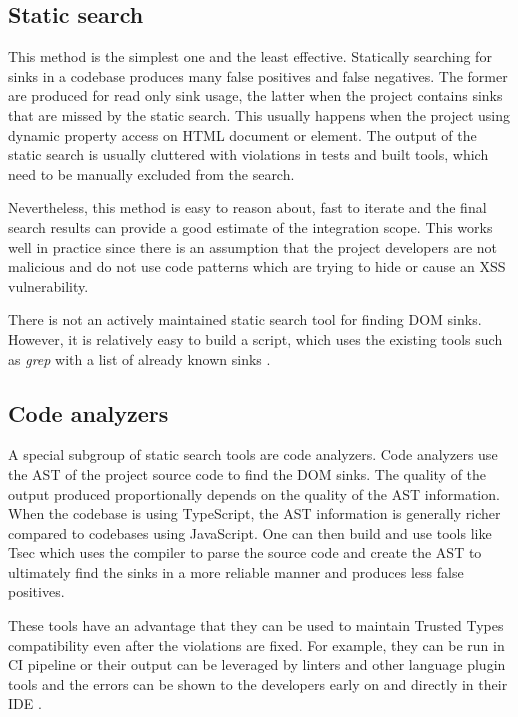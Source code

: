 \subsection{Static search}

This method is the simplest one and the least effective. Statically searching for sinks in a
codebase produces many false positives and false negatives. The former are produced for read only
sink usage, the latter when the project contains sinks that are missed by the static search. This
usually happens when the project using dynamic property access on HTML document or element. The
output of the static search is usually cluttered with violations in tests and built tools, which
need to be manually excluded from the search.

Nevertheless, this method is easy to reason about, fast to iterate and the final search results can
provide a good estimate of the integration scope. This works well in practice since there is an
assumption that the project developers are not malicious and do not use code patterns which are
trying to hide or cause an XSS vulnerability.

There is not an actively maintained static search tool for finding DOM sinks. However, it is
relatively easy to build a script, which uses the existing tools such as \emph{grep} with a list
of already known sinks \cite{xss_sink_finder}.

\subsection{Code analyzers}

A special subgroup of static search tools are code analyzers. Code analyzers use the AST of the
project source code to find the DOM sinks. The quality of the output produced proportionally depends
on the quality of the AST information. When the codebase is using TypeScript, the AST information is
generally richer compared to codebases using JavaScript. One can then build and use tools like Tsec
\cite{tsec_github} which uses the compiler to parse the source code and create the AST to ultimately
find the sinks in a more reliable manner and produces less false positives.

These tools have an advantage that they can be used to maintain Trusted Types compatibility even
after the violations are fixed. For example, they can be run in CI pipeline or their output can be
leveraged by linters and other language plugin tools and the errors can be shown to the developers
early on and directly in their IDE \cite{tsec_lsp}.

